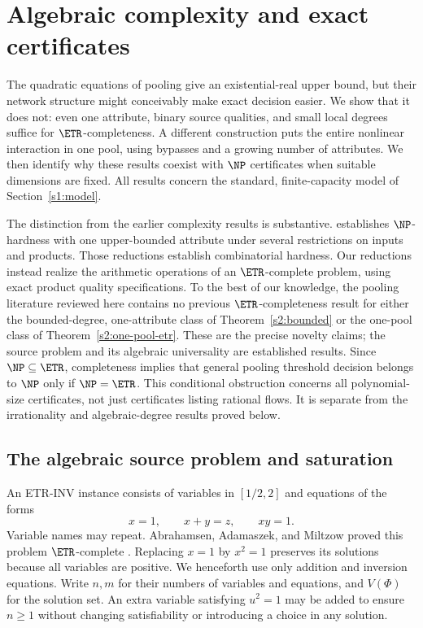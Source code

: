 \section{Algebraic complexity and exact certificates}\label{s2:algebraic}

The quadratic equations of pooling give an existential-real upper bound,
but their network structure might conceivably make exact decision easier.
We show that it does not: even one attribute, binary source qualities,
and small local degrees suffice for $\ETR$-completeness. A different
construction puts the entire nonlinear interaction in one pool, using
bypasses and a growing number of attributes. We then identify why these
results coexist with $\NP$ certificates when suitable dimensions are
fixed. All results concern the standard, finite-capacity model of
Section~\ref{s1:model}.

The distinction from the earlier complexity results is substantive.
\citet[Theorems~3--5]{haugland2016-the-computational-complexity-of-the}
establishes $\NP$-hardness with one upper-bounded attribute under several
restrictions on inputs and products. Those reductions establish
combinatorial hardness. Our reductions instead realize the arithmetic
operations of an $\ETR$-complete problem, using exact product quality
specifications. To the best of our knowledge, the pooling literature
reviewed here contains no previous $\ETR$-completeness result for either
the bounded-degree, one-attribute class of Theorem~\ref{s2:bounded} or
the one-pool class of Theorem~\ref{s2:one-pool-etr}. These are the precise
novelty claims; the source problem and its algebraic universality are
established results. Since $\NP\subseteq\ETR$, completeness implies that
general pooling threshold decision belongs to $\NP$ only if
$\NP=\ETR$. This conditional obstruction concerns all polynomial-size
certificates, not just certificates listing rational flows. It is
separate from the irrationality and algebraic-degree results proved
below.

\subsection{The algebraic source problem and saturation}\label{s2:source}

An \textsc{ETR-INV} instance consists of variables in $[1/2,2]$ and
equations of the forms
\begin{equation}
 x=1,\qquad x+y=z,\qquad xy=1.\label{s2:etr-inv}
\end{equation}
Variable names may repeat. Abrahamsen, Adamaszek, and Miltzow proved this
problem $\ETR$-complete
\citep[Definition~5 and Theorem~7 of the arXiv version]{abrahamsen2022-the-art-gallery-problem-is}.
Replacing $x=1$ by $x^2=1$ preserves its solutions because all variables
are positive. We henceforth use only addition and inversion equations.
Write $n,m$ for their numbers of variables and equations, and $V(\Phi)$
for the solution set. An extra variable satisfying $u^2=1$ may be added
to ensure $n\ge1$ without changing satisfiability or introducing a choice
in any solution.

